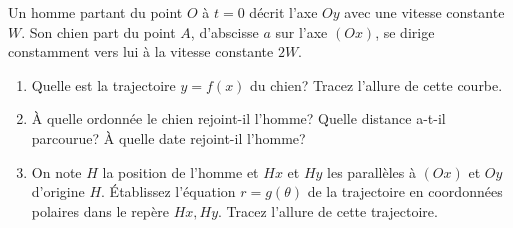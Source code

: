 %
\begin{exercice}%
  Un homme partant du point \(O\) à \(t=0\) décrit l'axe \(Oy\) avec une 
  vitesse constante \(W\). Son chien part du point \(A\), d'abscisse \(a\) sur 
  l'axe \((Ox)\), se dirige constamment vers lui à la vitesse constante \(2W\).
  \begin{enumerate}%
  \item Quelle est la trajectoire \(y=f(x)\) du chien? Tracez l'allure de 
  cette courbe.
  \item À quelle ordonnée le chien rejoint-il l'homme? Quelle distance a-t-il 
    parcourue? À quelle date rejoint-il l'homme?
  \item On note \(H\) la position de l'homme et \(Hx\) et \(Hy\) les 
  parallèles à \((Ox)\) et \(Oy\) d'origine \(H\). Établissez l'équation 
  \(r=g(\theta)\) de la trajectoire en coordonnées polaires dans le repère 
  \(Hx,Hy\). Tracez l'allure de cette trajectoire.
  \end{enumerate}%
\end{exercice}%
